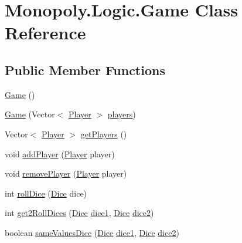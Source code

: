 \hypertarget{class_monopoly_1_1_logic_1_1_game}{}\section{Monopoly.\+Logic.\+Game Class Reference}
\label{class_monopoly_1_1_logic_1_1_game}
\subsection*{Public Member Functions}
\begin{DoxyCompactItemize}
\item 
\hyperlink{class_monopoly_1_1_logic_1_1_game_a5f2946cff44df4b850dc41825029f353}{Game} ()
\item 
\hyperlink{class_monopoly_1_1_logic_1_1_game_a6b50a9d7c49c5ca0d91c7816bd8acff1}{Game} (Vector$<$ \hyperlink{class_monopoly_1_1_logic_1_1_player}{Player} $>$ \hyperlink{class_monopoly_1_1_logic_1_1_game_abc3b3d5d0514ad27889ffd8f80cb58e9}{players})
\item 
Vector$<$ \hyperlink{class_monopoly_1_1_logic_1_1_player}{Player} $>$ \hyperlink{class_monopoly_1_1_logic_1_1_game_a057dfd53e851958229778a86c2981d7b}{get\+Players} ()
\item 
void \hyperlink{class_monopoly_1_1_logic_1_1_game_a349c8f09683bfc289c9dc4df4c276661}{add\+Player} (\hyperlink{class_monopoly_1_1_logic_1_1_player}{Player} player)
\item 
void \hyperlink{class_monopoly_1_1_logic_1_1_game_aa229aa82e1a30f6e17bc10aaef31ba04}{remove\+Player} (\hyperlink{class_monopoly_1_1_logic_1_1_player}{Player} player)
\item 
int \hyperlink{class_monopoly_1_1_logic_1_1_game_a39ddf33998efee021f9680b733017fb3}{roll\+Dice} (\hyperlink{class_monopoly_1_1_logic_1_1_dice}{Dice} dice)
\item 
int \hyperlink{class_monopoly_1_1_logic_1_1_game_ae9de8479abf1ab8fb0ad7811ebcf176c}{get2\+Roll\+Dices} (\hyperlink{class_monopoly_1_1_logic_1_1_dice}{Dice} \hyperlink{class_monopoly_1_1_logic_1_1_game_ade748d7293525398b9c16959dbb5dd30}{dice1}, \hyperlink{class_monopoly_1_1_logic_1_1_dice}{Dice} \hyperlink{class_monopoly_1_1_logic_1_1_game_af248656616e885a175559dc3a1131478}{dice2})
\item 
boolean \hyperlink{class_monopoly_1_1_logic_1_1_game_a8454773c0f8d469f9c6e6a2583cb2ce1}{same\+Values\+Dice} (\hyperlink{class_monopoly_1_1_logic_1_1_dice}{Dice} \hyperlink{class_monopoly_1_1_logic_1_1_game_ade748d7293525398b9c16959dbb5dd30}{dice1}, \hyperlink{class_monopoly_1_1_logic_1_1_dice}{Dice} \hyperlink{class_monopoly_1_1_logic_1_1_game_af248656616e885a175559dc3a1131478}{dice2})

\end{DoxyCompactItemize}
